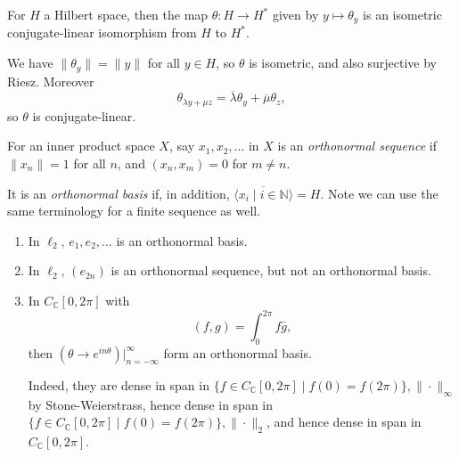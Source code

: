 \documentclass[12pt]{article}
\begin{document}
\begin{corollary}
	For $H$ a Hilbert space, then the map $\theta : H \to H^{\ast}$ given by $y \mapsto \theta_y$ is an isometric conjugate-linear isomorphism from $H$ to $H^{\ast}$.
\end{corollary}

\begin{proofbox}
	We have $\|\theta_y\| = \|y\|$ for all $y \in H$, so $\theta$ is isometric, and also surjective by Riesz. Moreover
	\[
	\theta_{\lambda y + \mu z} = \overline{\lambda} \theta_y + \overline{\mu} \theta_z,
	\]
	so $\theta$ is conjugate-linear.
\end{proofbox}

For an inner product space $X$, say $x_1, x_2, \ldots$ in $X$ is an \emph{orthonormal sequence} if $\|x_n\| = 1$ for all $n$, and $(x_n, x_m) = 0$ for $m \neq n$.

It is an \emph{orthonormal basis} if, in addition, $\overline{\langle x_i \mid i \in \mathbb{N} \rangle} = H$. Note we can use the same terminology for a finite sequence as well.

\begin{exbox}
	\begin{enumerate}
		\item In $\ell_2$, $e_1, e_2, \ldots$ is an orthonormal basis.
		\item In $\ell_2$, $(e_{2n})$ is an orthonormal sequence, but not an orthonormal basis.
		\item In $C_{\mathbb{C}}[0, 2\pi]$ with
			\[
				(f, g) = \int_0^{2 \pi} f \bar g,
			\]
			then $(\theta \to e^{i n \theta})|_{n = -\infty}^{\infty}$ form an orthonormal basis.

			Indeed, they are dense in span in $\{f \in C_{\mathbb{C}}[0, 2\pi] \mid f(0) = f(2\pi)\}, \|\cdot\|_{\infty}$ by Stone-Weierstrass, hence dense in span in $\{f \in C_{\mathbb{C}}[0, 2\pi] \mid f(0) = f(2\pi)\}, \|\cdot\|_{2}$, and hence dense in span in $C_{\mathbb{C}}[0, 2\pi]$.
	\end{enumerate}
\end{exbox}

\end{document}
